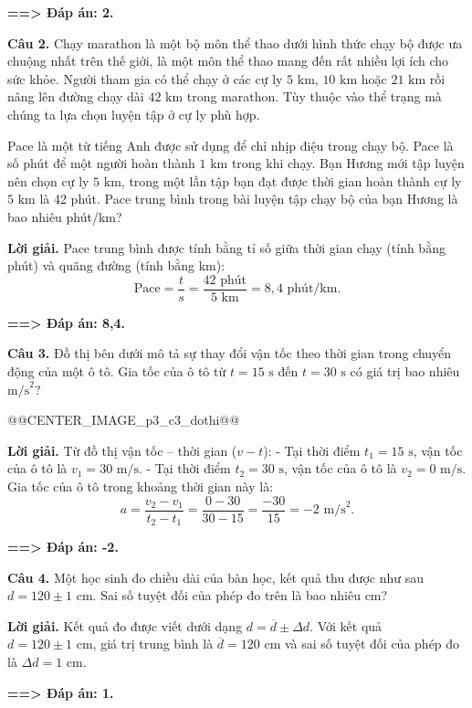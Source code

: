 \documentclass[11pt,a4paper]{article}
\begin{document}
\textbf{==> Đáp án: 2.}

\textbf{Câu 2.} Chạy marathon là một bộ môn thể thao dưới hình thức chạy bộ được ưa chuộng nhất trên thế giới, là một môn thể thao mang đến rất nhiều lợi ích cho sức khỏe. Người tham gia có thể chạy ở các cự ly $5\text{ km}$, $10\text{ km}$ hoặc $21\text{ km}$ rồi nâng lên đường chạy dài $42\text{ km}$ trong marathon. Tùy thuộc vào thể trạng mà chúng ta lựa chọn luyện tập ở cự ly phù hợp.

Pace là một từ tiếng Anh được sử dụng để chỉ nhịp điệu trong chạy bộ. Pace là số phút để một người hoàn thành $1\text{ km}$ trong khi chạy. Bạn Hương mới tập luyện nên chọn cự ly $5\text{ km}$, trong một lần tập bạn đạt được thời gian hoàn thành cự ly $5\text{ km}$ là 42 phút. Pace trung bình trong bài luyện tập chạy bộ của bạn Hương là bao nhiêu phút/km?

\textbf{Lời giải.} Pace trung bình được tính bằng tỉ số giữa thời gian chạy (tính bằng phút) và quãng đường (tính bằng km):
\[
\text{Pace} = \frac{t}{s} = \frac{42\text{ phút}}{5\text{ km}} = 8{,}4\text{ phút/km}.
\]

\textbf{==> Đáp án: 8,4.}

\textbf{Câu 3.} Đồ thị bên dưới mô tả sự thay đổi vận tốc theo thời gian trong chuyển động của một ô tô. Gia tốc của ô tô từ $t = 15\text{ s}$ đến $t = 30\text{ s}$ có giá trị bao nhiêu $\text{m/s}^2$?

@@CENTER_IMAGE_p3_c3_dothi@@

\textbf{Lời giải.} Từ đồ thị vận tốc -- thời gian ($v - t$):
- Tại thời điểm $t_1 = 15\text{ s}$, vận tốc của ô tô là $v_1 = 30\text{ m/s}$.
- Tại thời điểm $t_2 = 30\text{ s}$, vận tốc của ô tô là $v_2 = 0\text{ m/s}$.
Gia tốc của ô tô trong khoảng thời gian này là:
\[
a = \frac{v_2 - v_1}{t_2 - t_1} = \frac{0 - 30}{30 - 15} = \frac{-30}{15} = -2\text{ m/s}^2.
\]

\textbf{==> Đáp án: -2.}

\textbf{Câu 4.} Một học sinh đo chiều dài của bàn học, kết quả thu được như sau $d = 120 \pm 1\text{ cm}$. Sai số tuyệt đối của phép đo trên là bao nhiêu cm?

\textbf{Lời giải.} Kết quả đo được viết dưới dạng $d = \overline{d} \pm \Delta d$. Với kết quả $d = 120 \pm 1\text{ cm}$, giá trị trung bình là $\overline{d} = 120\text{ cm}$ và sai số tuyệt đối của phép đo là $\Delta d = 1\text{ cm}$.

\textbf{==> Đáp án: 1.}
\end{document}
